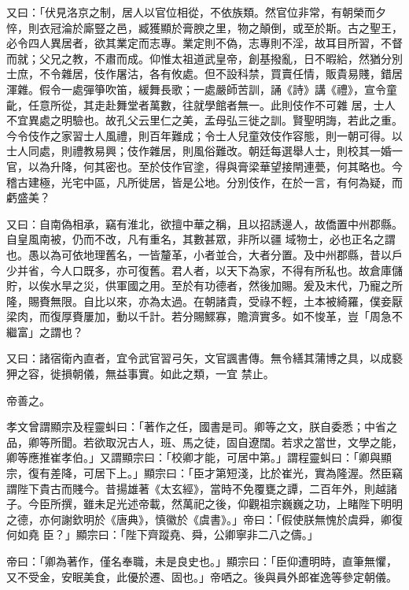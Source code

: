 \begin{pinyinscope}
 又曰：「伏見洛京之制，居人以官位相從，不依族類。然官位非常，有朝榮而夕悴，則衣冠淪於廝豎之邑，臧獲顯於膏腴之里，物之顛倒，或至於斯。古之聖王，必令四人異居者，欲其業定而志專。業定則不偽，志專則不淫，故耳目所習，不督而就；父兄之教，不肅而成。仰惟太祖道武皇帝，創基撥亂，日不暇給，然猶分別士庶，不令雜居，伎作屠沽，各有攸處。但不設科禁，買賣任情，販貴易賤，錯居渾雜。假令一處彈箏吹笛，緩舞長歌；一處嚴師苦訓，誦《詩》講《禮》，宣令童齔，任意所從，其走赴舞堂者萬數，往就學館者無一。此則伎作不可雜
 居，士人不宜異處之明驗也。故孔父云里仁之美，孟母弘三徙之訓。賢聖明誨，若此之重。今令伎作之家習士人風禮，則百年難成；令士人兒童效伎作容態，則一朝可得。以士人同處，則禮教易興；伎作雜居，則風俗難改。朝廷每選舉人士，則校其一婚一官，以為升降，何其密也。至於伎作官塗，得與膏梁華望接閈連甍，何其略也。今稽古建極，光宅中區，凡所徙居，皆是公地。分別伎作，在於一言，有何為疑，而虧盛美？



 又曰：自南偽相承，竊有淮北，欲擅中華之稱，且以招誘邊人，故僑置中州郡縣。自皇風南被，仍而不改，凡有重名，其數甚眾，非所以疆
 域物士，必也正名之謂也。愚以為可依地理舊名，一皆釐革，小者並合，大者分置。及中州郡縣，昔以戶少并省，今人口既多，亦可復舊。君人者，以天下為家，不得有所私也。故倉庫儲貯，以俟水旱之災，供軍國之用。至於有功德者，然後加賜。爰及末代，乃寵之所隆，賜賚無限。自比以來，亦為太過。在朝諸貴，受祿不輕，土本被綺羅，僕妾厭梁肉，而復厚賚屢加，動以千計。若分賜鰥寡，贍濟實多。如不悛革，豈「周急不繼富」之謂也？



 又曰：諸宿衛內直者，宜令武官習弓矢，文官諷書傳。無令繕其蒲博之具，以成褻狎之容，徙損朝儀，無益事實。如此之類，一宜
 禁止。



 帝善之。



 孝文曾謂顯宗及程靈虯曰：「著作之任，國書是司。卿等之文，朕自委悉；中省之品，卿等所聞。若欲取況古人，班、馬之徒，固自遼闊。若求之當世，文學之能，卿等應推崔孝伯。」又謂顯宗曰：「校卿才能，可居中第。」謂程靈虯曰：「卿與顯宗，復有差降，可居下上。」顯宗曰：「臣才第短淺，比於崔光，實為隆渥。然臣竊謂陛下貴古而賤今。昔揚雄著《太玄經》，當時不免覆甕之譚，二百年外，則越諸子。今臣所撰，雖未足光述帝載，然萬祀之後，仰觀祖宗巍巍之功，上睹陛下明明之德，亦何謝欽明於《唐典》，慎徽於《虞書》。」帝曰：「假使朕無愧於虞舜，卿復何如堯
 臣？」顯宗曰：「陛下齊蹤堯、舜，公卿寧非二八之儔。」



 帝曰：「卿為著作，僅名奉職，未是良史也。」顯宗曰：「臣仰遭明時，直筆無懼，又不受金，安眠美食，此優於遷、固也。」帝哂之。後與員外郎崔逸等參定朝儀。




\end{pinyinscope}

